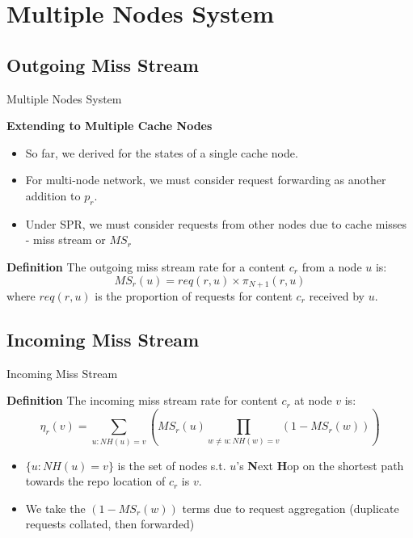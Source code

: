 \documentclass[
	xcolor={svgnames},
	hyperref={pagebackref,bookmarks},
	aspectratio=43,
]{beamer}
\begin{document}
\section{Multiple Nodes System}
\subsection*{Outgoing Miss Stream}
\begin{frame}{Multiple Nodes System}
    \begin{block}{\textbf{Extending to Multiple Cache Nodes}}
        \begin{itemize}
            \item So far, we derived for the states of a single cache node. 
            \item For multi-node network, we must consider request forwarding as another addition to $p_r$.
            \item Under SPR, we must consider requests from other nodes due to cache misses - miss stream or $MS_r$
        \end{itemize}
    \end{block}
    \begin{block}{\textbf{Definition}}
        The outgoing miss stream rate for a content $c_r$ from a node $u$ is:
        \begin{equation}
            MS_r(u) = req(r,u) \times \pi_{N+1}(r,u)
        \end{equation}
        where $req(r,u)$ is the proportion of requests for content $c_r$ received by $u$.
    \end{block}
\end{frame}

\subsection*{Incoming Miss Stream}
\begin{frame}{Incoming Miss Stream}
    \begin{block}{\textbf{Definition}}
        The incoming miss stream rate for content $c_r$ at node $v$ is:
        \begin{equation}
            \eta_r(v) = \sum_{u:NH(u)=v} \left( MS_r(u) \prod_{w \neq u:NH(w)=v} \left(1 - MS_r(w)\right)\right)
        \end{equation}
        \begin{itemize}
            \item $\{u:NH(u)=v\}$ is the set of nodes s.t. $u$'s \textbf{N}ext \textbf{H}op on the shortest path towards the repo location of $c_r$ is $v$.
            \item We take the $(1 - MS_r(w))$ terms due to request aggregation (duplicate requests collated, then forwarded)
        \end{itemize}
    \end{block}
\end{frame}
\end{document}
